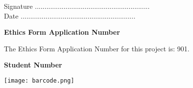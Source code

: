 \vspace{2em}
Signature ............................................................  \\

\vspace{1em}
Date ............................................................ \\

\begin{center}
    {\LARGE\bf Ethics Form Application Number}
    
The Ethics Form Application Number for this project is: 901. 
\end{center}

\vspace{5em}
\begin{center}
    {\LARGE\bf Student Number}

\texttt{[image: barcode.png]}
\end{center}
